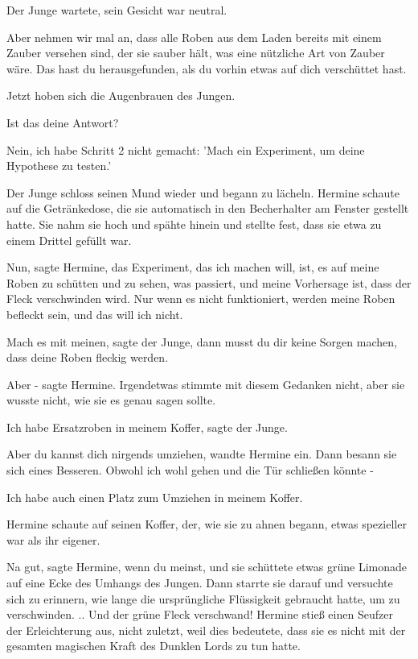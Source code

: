 Der Junge wartete, sein Gesicht war neutral.

\glqq{}Aber nehmen wir mal an, dass alle Roben aus dem Laden bereits mit einem
Zauber versehen sind, der sie sauber hält, was eine nützliche Art von Zauber
wäre. Das hast du herausgefunden, als du vorhin etwas auf dich verschüttet
hast.\grqq{}

Jetzt hoben sich die Augenbrauen des Jungen.

\glqq{}Ist das deine Antwort?\grqq{}

\glqq{}Nein, ich habe Schritt 2 nicht gemacht: 'Mach ein Experiment, um deine
Hypothese zu testen.'\grqq{}

Der Junge schloss seinen Mund wieder und begann zu lächeln. Hermine schaute auf
die Getränkedose, die sie automatisch in den Becherhalter am Fenster gestellt
hatte. Sie nahm sie hoch und spähte hinein und stellte fest, dass sie etwa zu
einem Drittel gefüllt war.

\glqq{}Nun\grqq{}, sagte Hermine, \glqq{}das Experiment, das ich machen will, ist,
es auf meine Roben zu schütten und zu sehen, was passiert, und meine Vorhersage
ist, dass der Fleck verschwinden wird. Nur wenn es nicht funktioniert, werden
meine Roben befleckt sein, und das will ich nicht.\grqq{}

\glqq{}Mach es mit meinen\grqq{}, sagte der Junge, \glqq{}dann musst du dir keine
Sorgen machen, dass deine Roben fleckig werden.\grqq{}

\glqq{}Aber -\grqq{} sagte Hermine. Irgendetwas stimmte mit diesem Gedanken
nicht, aber sie wusste nicht, wie sie es genau sagen sollte.

\glqq{}Ich habe Ersatzroben in meinem Koffer\grqq{}, sagte der Junge.

\glqq{}Aber du kannst dich nirgends umziehen\grqq{}, wandte Hermine ein. Dann
besann sie sich eines Besseren. \glqq{}Obwohl ich wohl gehen und die Tür
schließen könnte -\grqq{}

\glqq{}Ich habe auch einen Platz zum Umziehen in meinem Koffer.\grqq{}

Hermine schaute auf seinen Koffer, der, wie sie zu ahnen begann, etwas
spezieller war als ihr eigener.

\glqq{}Na gut\grqq{}, sagte Hermine, \glqq{}wenn du meinst\grqq{}, und sie
schüttete etwas grüne Limonade auf eine Ecke des Umhangs des Jungen. Dann
starrte sie darauf und versuchte sich zu erinnern, wie lange die ursprüngliche
Flüssigkeit gebraucht hatte, um zu verschwinden. .. Und der grüne Fleck
verschwand! Hermine stieß einen Seufzer der Erleichterung aus, nicht zuletzt,
weil dies bedeutete, dass sie es nicht mit der gesamten magischen Kraft des
Dunklen Lords zu tun hatte.

